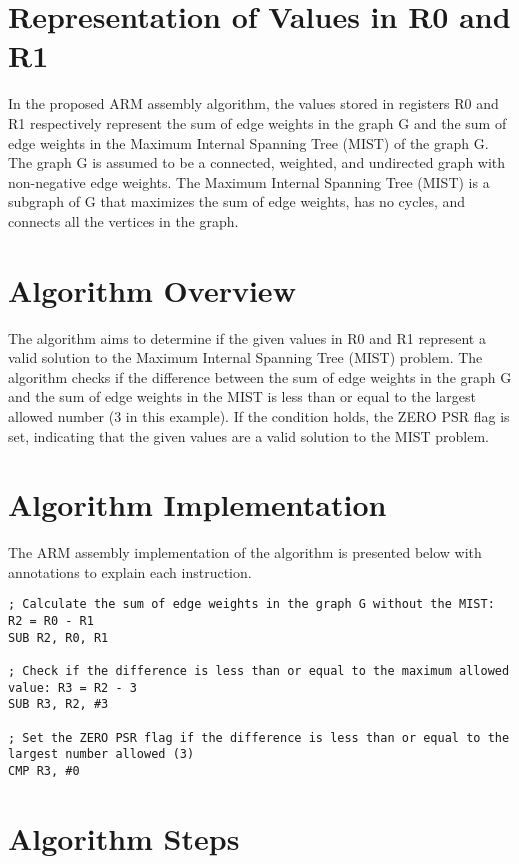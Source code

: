 \section{Representation of Values in R0 and R1}

In the proposed ARM assembly algorithm, the values stored in registers R0 and R1 respectively represent the sum of edge weights in the graph G and the sum of edge weights in the Maximum Internal Spanning Tree (MIST) of the graph G. The graph G is assumed to be a connected, weighted, and undirected graph with non-negative edge weights. The Maximum Internal Spanning Tree (MIST) is a subgraph of G that maximizes the sum of edge weights, has no cycles, and connects all the vertices in the graph.

\section{Algorithm Overview}

The algorithm aims to determine if the given values in R0 and R1 represent a valid solution to the Maximum Internal Spanning Tree (MIST) problem. The algorithm checks if the difference between the sum of edge weights in the graph G and the sum of edge weights in the MIST is less than or equal to the largest allowed number (3 in this example). If the condition holds, the ZERO PSR flag is set, indicating that the given values are a valid solution to the MIST problem.

\section{Algorithm Implementation}

The ARM assembly implementation of the algorithm is presented below with annotations to explain each instruction.

\begin{verbatim}
; Calculate the sum of edge weights in the graph G without the MIST: R2 = R0 - R1
SUB R2, R0, R1

; Check if the difference is less than or equal to the maximum allowed value: R3 = R2 - 3
SUB R3, R2, #3

; Set the ZERO PSR flag if the difference is less than or equal to the largest number allowed (3)
CMP R3, #0
\end{verbatim}

\section{Algorithm Steps}

